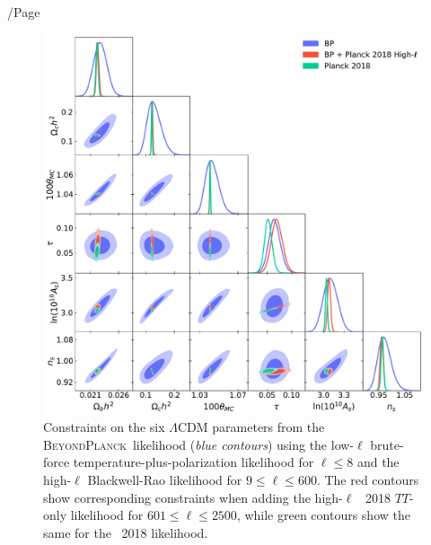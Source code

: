 /Page\documentclass[twocolumn]{aa}
\newcommand{\BP}{\textsc{BeyondPlanck}}
\begin{document}
\begin{figure}[t]
	\center
	\includegraphics[width=\linewidth]{figs/BP10_comparison_6params.pdf}
  \caption{Constraints on the six $\Lambda$CDM parameters from the
    \BP\ likelihood (\emph{blue contours}) using the low-$\ell$ brute-force
    temperature-plus-polarization likelihood for $\ell\le 8$ and the
    high-$\ell$ Blackwell-Rao likelihood for $9\le\ell\le600$. The red
    contours show corresponding constraints when adding the
    high-$\ell$ \Planck\ 2018 $TT$-only likelihood for $601\le\ell\le
    2500$, while green contours show the same for the \Planck\ 2018
    likelihood.}
	\label{fig:full_params}
\end{figure}
\end{document}
